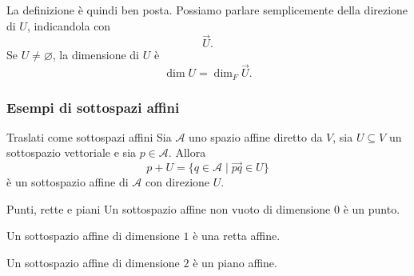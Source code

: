 \documentclass[a4paper]{article}
\begin{document}
La definizione è quindi ben posta. Possiamo parlare semplicemente della direzione di \(U\), indicandola con
\[
    \overrightarrow{U}.
\]
Se \(U\neq\varnothing\), la dimensione di \(U\) è
\[
    \dim U=\dim_F\overrightarrow{U}.
\]

\subsubsection{Esempi di sottospazi affini}

\begin{snippetexample}{Traslati come sottospazi affini}
    Sia \(\mathcal{A}\) uno spazio affine diretto da \(V\), sia \(U\subseteq V\) un sottospazio vettoriale e sia \(p\in\mathcal{A}\). Allora
    \[
        p+U
        =
        \{q\in\mathcal{A}\mid \overrightarrow{pq}\in U\}
    \]
    è un sottospazio affine di \(\mathcal{A}\) con direzione \(U\).
\end{snippetexample}

\begin{snippetexample}{Punti, rette e piani}
    Un sottospazio affine non vuoto di dimensione \(0\) è un punto.

    Un sottospazio affine di dimensione \(1\) è una retta affine.

    Un sottospazio affine di dimensione \(2\) è un piano affine.
\end{snippetexample}
\end{document}
